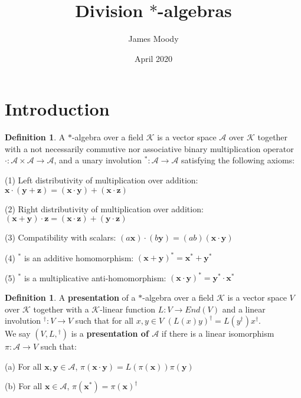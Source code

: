 \documentclass[12pt]{article}
\title{Division $*$-algebras}
\author{James Moody}
\date{April 2020}
\theoremstyle{definition}
\newtheorem{definition}[theorem]{Definition}
\theoremstyle{remark}
\begin{document}
\maketitle

\section*{Introduction} 

\begin{definition} A $*$-algebra over a field $\mathcal{K}$ is a vector space $\mathcal{A}$ over $\mathcal{K}$ together with a not necessarily commutive nor associative binary multiplication operator $\cdot: \mathcal{A} \times \mathcal{A} \rightarrow \mathcal{A}$, and a unary involution $^*:\mathcal{A} \rightarrow \mathcal{A}$ satisfying the following axioms:

(1) Left distributivity of multiplication over addition: $\mathbf{x} \cdot (\mathbf{y} + \mathbf{z}) = (\mathbf{x} \cdot \mathbf{y}) + (\mathbf{x} \cdot \mathbf{z})$

(2) Right distributivity of multiplication over addition: $(\mathbf{x}+\mathbf{y}) \cdot \mathbf{z} = (\mathbf{x} \cdot \mathbf{z}) + (\mathbf{y} \cdot \mathbf{z})$

(3) Compatibility with scalars: $(a\mathbf{x}) \cdot (b \mathbf{y}) = (ab)(\mathbf{x} \cdot \mathbf{y})$

(4) $^*$ is an additive homomorphism: $(\mathbf{x}+\mathbf{y})^* = \mathbf{x}^* + \mathbf{y}^*$

(5) $^*$ is a multiplicative anti-homomorphism: $(\mathbf{x} \cdot \mathbf{y})^* = \mathbf{y}^* \cdot \mathbf{x}^*$
\end{definition}

\begin{definition} A \textbf{presentation} of a $*$-algebra over a field $\mathcal{K}$ is a vector space $V$ over \(\mathcal{K}\) together with a $\mathcal{K}$-linear function $L: V \rightarrow End(V)$ and a linear involution $^{\dagger} : V \rightarrow V$ such that for all \(x,y \in V\) $(L(x)y)^{\dagger} = L(y^{\dagger}) x^{\dagger}$.\\

\noindent We say \((V, L, {}^\dagger)\) is a \textbf{presentation of \(\mathcal{A}\)} if there is a linear isomorphism \(\pi: \mathcal{A} \rightarrow V\) such that:

(a) For all $\mathbf{x}, \mathbf{y} \in \mathcal{A}$, $\pi(\mathbf{x} \cdot \mathbf{y}) = L(\pi(\mathbf{x})) \pi(\mathbf{y})$ 

(b) For all $\mathbf{x} \in \mathcal{A}$, $\pi(\mathbf{x}^*) = \pi(\mathbf{x})^{\dagger}$
\end{definition} 
\end{document}
